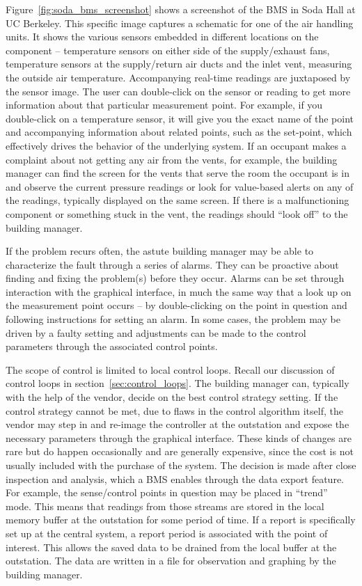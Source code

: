 Figure~\ref{fig:soda_bms_screenshot} shows a screenshot of the BMS in Soda Hall at UC Berkeley.  This specific image
captures a schematic for one of the air handling units.  It shows the various sensors embedded in different locations
on the component -- temperature sensors on either side of the supply/exhaust fans, temperature sensors at the supply/return 
air ducts and the inlet vent, measuring the outside air temperature.  Accompanying real-time readings are juxtaposed
by the sensor image.  The user can double-click on the sensor or reading to get more information about that particular 
measurement point.  For example, if you double-click on a temperature sensor, it will give you the exact name of the 
point and accompanying information about related points, such as the set-point, which effectively drives the behavior of 
the underlying system.  If an occupant makes a complaint about not getting any air from the vents, for example, the 
building manager can find the screen for the vents that serve the room the occupant is in and observe the current
pressure readings or look for value-based alerts on any of the readings, typically displayed on the same screen.
If there is a malfunctioning component or something stuck in the vent, the readings should ``look off'' to the building 
manager.

If the problem recurs often, the astute building manager may be able to characterize the fault through a series of alarms.
They can be proactive about finding and fixing the problem(s) before they occur.  Alarms can be set through interaction
with the graphical interface, in much the same way that a look up on the measurement point occurs -- by double-clicking on 
the point in question and following instructions for setting an alarm.  In some cases, the problem may be driven 
by a faulty setting and adjustments can be made to the control parameters through the associated control points.

The scope of control is limited to local control loops.  Recall our discussion of control loops in section~\ref{sec:control_loops}.
The building manager can, typically with the help of the vendor, decide on the best control strategy setting.  If the control
strategy cannot be met, due to flaws in the control algorithm itself, the vendor may step in and re-image the controller
at the outstation and expose the necessary parameters through the graphical interface.  These kinds of changes are rare
but do happen occasionally and are generally expensive, since the cost is not usually included with the purchase
of the system.  The decision is made after close inspection and analysis, which a BMS enables through the data export feature.  
For example, the sense/control points in question may be placed in ``trend'' mode.  This means that readings
from those streams are stored in the local memory buffer at the outstation for some period of time.  If a report is specifically
set up at the central system, a report period is associated with the point of interest. This allows the saved data to be drained
from the local buffer at the outstation.  The data are written in a file for observation and graphing by the 
building manager.  %

